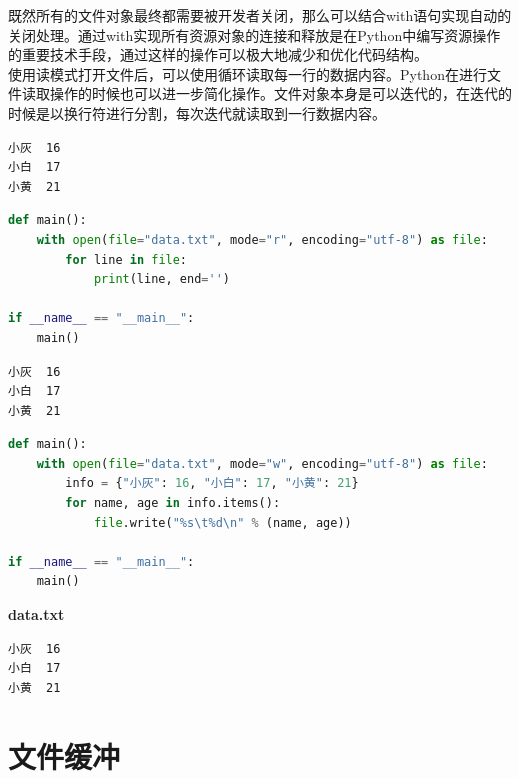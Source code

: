 既然所有的文件对象最终都需要被开发者关闭，那么可以结合with语句实现自动的关闭处理。通过with实现所有资源对象的连接和释放是在Python中编写资源操作的重要技术手段，通过这样的操作可以极大地减少和优化代码结构。\\

使用读模式打开文件后，可以使用循环读取每一行的数据内容。Python在进行文件读取操作的时候也可以进一步简化操作。文件对象本身是可以迭代的，在迭代的时候是以换行符进行分割，每次迭代就读取到一行数据内容。\\


\begin{lstlisting}[title=data.txt]
小灰	16
小白	17
小黄	21
\end{lstlisting}

\begin{lstlisting}[language=Python, title=read\_file.py]
def main():
	with open(file="data.txt", mode="r", encoding="utf-8") as file:
		for line in file:
			print(line, end='')

if __name__ == "__main__":
	main()
\end{lstlisting}

\begin{tcolorbox}
	\begin{verbatim}
小灰	16
小白	17
小黄	21
\end{verbatim}
\end{tcolorbox}

\vspace{0.5cm}


\begin{lstlisting}[language=Python]
def main():
	with open(file="data.txt", mode="w", encoding="utf-8") as file:
		info = {"小灰": 16, "小白": 17, "小黄": 21}
		for name, age in info.items():
			file.write("%s\t%d\n" % (name, age))

if __name__ == "__main__":
	main()
\end{lstlisting}

\begin{tcolorbox}
	\textbf{data.txt}
	\begin{verbatim}
小灰	16
小白	17
小黄	21
\end{verbatim}
\end{tcolorbox}

\newpage

\section{文件缓冲}

